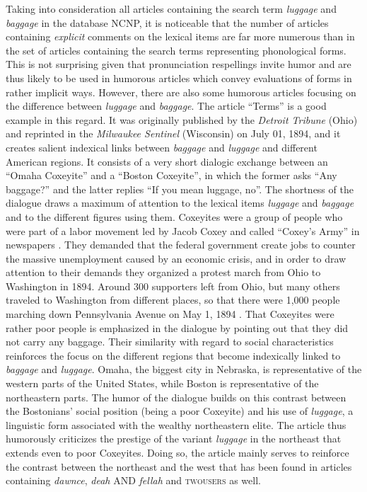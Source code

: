 Taking into consideration all articles containing the search term \emph{luggage} and \emph{baggage} in the database NCNP, it is noticeable that the number of articles containing \emph{explicit} comments on the lexical items are far more numerous than in the set of articles containing the search terms representing phonological forms. This is not surprising given that pronunciation respellings invite humor and are thus likely to be used in humorous articles which convey evaluations of forms in rather implicit ways. However, there are also some humorous articles focusing on the difference between \emph{luggage} and \emph{baggage}. The article “Terms” is a good example in this regard. It was originally published by the \emph{Detroit Tribune} (Ohio) and reprinted in the \emph{Milwaukee Sentinel} (Wisconsin) on July 01, 1894, and it creates salient indexical links between \emph{baggage} and \emph{luggage} and different American regions. It consists of a very short dialogic exchange between an “Omaha Coxeyite” and a “Boston Coxeyite”, in which the former asks “Any baggage?” and the latter replies “If you mean luggage, no”. The shortness of the dialogue draws a maximum of attention to the lexical items \emph{luggage} and \emph{baggage} and to the different figures using them. Coxeyites were a group of people who were part of a labor movement led by Jacob Coxey and called “Coxey’s Army” in newspapers \citep[327]{Barber2007}. They demanded that the federal government create jobs to counter the massive unemployment caused by an economic crisis, and in order to draw attention to their demands they organized a protest march from Ohio to Washington in 1894. Around 300 supporters left from Ohio, but many others traveled to Washington from different places, so that there were 1,000 people marching down Pennsylvania Avenue on May 1, 1894 \citep[327]{Barber2007}. That Coxeyites were rather poor people is emphasized in the dialogue by pointing out that they did not carry any baggage. Their similarity with regard to social characteristics reinforces the focus on the different regions that become indexically linked to \emph{baggage} and \emph{luggage}. Omaha, the biggest city in Nebraska, is representative of the western parts of the United States, while Boston is representative of the northeastern parts. The humor of the dialogue builds on this contrast between the Bostonians’ social position (being a poor Coxeyite) and his use of \emph{luggage}, a linguistic form associated with the wealthy northeastern elite. The article thus humorously criticizes the prestige of the variant \emph{luggage} in the northeast that extends even to poor Coxeyites. Doing so, the article mainly serves to reinforce the contrast between the northeast and the west that has been found in articles containing \emph{dawnce}, \emph{deah} AND \emph{fellah} and \textsc{twousers} as well.

